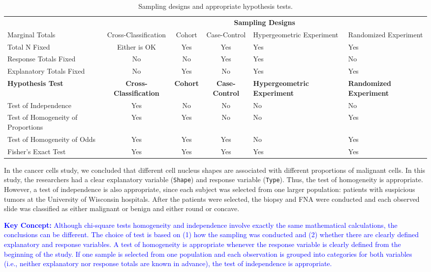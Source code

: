 \documentclass[
]{report}
\begin{document}
\begin{table}[!h]
\centering
\caption{\label{tab:tab56} Sampling designs and appropriate hypothesis tests.}
\centering
\begin{tabular}[t]{>{\raggedright\arraybackslash}p{2cm}ccc>{\centering\arraybackslash}p{3cm}>{\centering\arraybackslash}p{2.5cm}}
\toprule
\multicolumn{1}{c}{\textbf{ }} & \multicolumn{5}{c}{\textbf{Sampling Designs}} \\
\cmidrule(l{3pt}r{3pt}){2-6}
Marginal Totals & Cross-Classification & Cohort & Case-Control & Hypergeometric Experiment & Randomized Experiment\\
\midrule
Total N Fixed & Either is OK & Yes & Yes & Yes & Yes\\
Response Totals Fixed & No & No & Yes & Yes & No\\
Explanatory Totals Fixed & No & Yes & No & Yes & Yes\\
\textbf{Hypothesis Test} & \textbf{Cross-Classification} & \textbf{Cohort} & \textbf{Case-Control} & \textbf{Hypergeometric Experiment} & \textbf{Randomized Experiment}\\
Test of Independence & Yes & No & No & No & No\\
\addlinespace
Test of Homogeneity of Proportions & Yes & Yes & No & No & Yes\\
Test of Homogeneity of Odds & Yes & Yes & Yes & No & Yes\\
Fisher's Exact Test & Yes & Yes & Yes & Yes & Yes\\
\bottomrule
\end{tabular}
\end{table}

In the cancer cells study, we concluded that different cell nucleus shapes are associated with different
proportions of malignant cells. In this study, the researchers had a clear explanatory variable (\texttt{Shape}) and response variable (\texttt{Type}). Thus, the test of homogeneity is appropriate. However, a test of independence is also appropriate, since each subject was selected from one larger population: patients with suspicious tumors at the University of Wisconsin hospitals. After the patients were selected, the biopsy and FNA were conducted and each observed slide was classified as either malignant or benign and either round or concave.

\textbf{\textcolor{blue}{Key Concept:}}
\textcolor{blue}{Although chi-square tests homogeneity and independence involve exactly the same mathematical calculations, the conclusions can be different. The choice of test is based on (1) how the sampling was conducted and (2) whether there are clearly defined explanatory and response variables. A test of homogeneity is appropriate whenever the response variable is clearly defined from the beginning of the study. If one sample is selected from one population and each observation is grouped into categories for both variables (i.e., neither explanatory nor response totals are known in advance), the test of independence is appropriate.}
\end{document}
